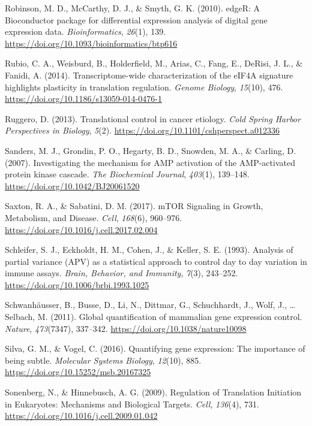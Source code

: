 \documentclass[12pt,openany]{book}
\begin{document}
\hypertarget{ref-Robinson2010}{}
Robinson, M. D., McCarthy, D. J., \& Smyth, G. K. (2010). edgeR: A
Bioconductor package for differential expression analysis of digital
gene expression data. \emph{Bioinformatics}, \emph{26}(1), 139.
\url{https://doi.org/10.1093/bioinformatics/btp616}

\hypertarget{ref-Rubio2014}{}
Rubio, C. A., Weisburd, B., Holderfield, M., Arias, C., Fang, E.,
DeRisi, J. L., \& Fanidi, A. (2014). Transcriptome-wide characterization
of the eIF4A signature highlights plasticity in translation regulation.
\emph{Genome Biology}, \emph{15}(10), 476.
\url{https://doi.org/10.1186/s13059-014-0476-1}

\hypertarget{ref-Ruggero2013}{}
Ruggero, D. (2013). Translational control in cancer etiology. \emph{Cold
Spring Harbor Perspectives in Biology}, \emph{5}(2).
\url{https://doi.org/10.1101/cshperspect.a012336}

\hypertarget{ref-Sanders2007}{}
Sanders, M. J., Grondin, P. O., Hegarty, B. D., Snowden, M. A., \&
Carling, D. (2007). Investigating the mechanism for AMP activation of
the AMP-activated protein kinase cascade. \emph{The Biochemical
Journal}, \emph{403}(1), 139--148.
\url{https://doi.org/10.1042/BJ20061520}

\hypertarget{ref-Saxton2017}{}
Saxton, R. A., \& Sabatini, D. M. (2017). mTOR Signaling in Growth,
Metabolism, and Disease. \emph{Cell}, \emph{168}(6), 960--976.
\url{https://doi.org/10.1016/j.cell.2017.02.004}

\hypertarget{ref-Schleifer1993}{}
Schleifer, S. J., Eckholdt, H. M., Cohen, J., \& Keller, S. E. (1993).
Analysis of partial variance (APV) as a statistical approach to control
day to day variation in immune assays. \emph{Brain, Behavior, and
Immunity}, \emph{7}(3), 243--252.
\url{https://doi.org/10.1006/brbi.1993.1025}

\hypertarget{ref-Schwanhausser2011}{}
Schwanhäusser, B., Busse, D., Li, N., Dittmar, G., Schuchhardt, J.,
Wolf, J., \ldots{} Selbach, M. (2011). Global quantification of
mammalian gene expression control. \emph{Nature}, \emph{473}(7347),
337--342. \url{https://doi.org/10.1038/nature10098}

\hypertarget{ref-Silva2016}{}
Silva, G. M., \& Vogel, C. (2016). Quantifying gene expression: The
importance of being subtle. \emph{Molecular Systems Biology},
\emph{12}(10), 885. \url{https://doi.org/10.15252/msb.20167325}

\hypertarget{ref-Sonenberg2009}{}
Sonenberg, N., \& Hinnebusch, A. G. (2009). Regulation of Translation
Initiation in Eukaryotes: Mechanisms and Biological Targets.
\emph{Cell}, \emph{136}(4), 731.
\url{https://doi.org/10.1016/j.cell.2009.01.042}
\end{document}
